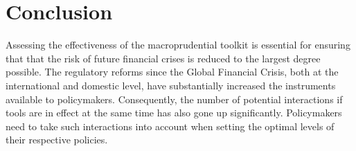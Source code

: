 \documentclass[12pt]{article}
\numberwithin{equation}{section}
\begin{document}

\section{Conclusion}

Assessing the effectiveness of the macroprudential toolkit is essential for ensuring that that the risk of future financial crises is reduced to the largest degree possible. The regulatory reforms since the Global Financial Crisis, both at the international and domestic level, have substantially increased the instruments available to policymakers. Consequently, the number of potential interactions if tools are in effect at the same time has also gone up significantly. Policymakers need to take such interactions into account when setting the optimal levels of their respective policies. 
\end{document}
